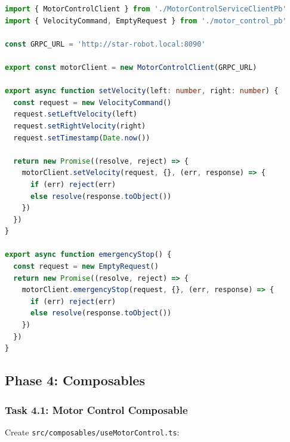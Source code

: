 \documentclass[11pt,letterpaper]{article}
\begin{document}
\begin{lstlisting}[language=TypeScript, caption=grpc/client.ts]
import { MotorControlClient } from './MotorControlServiceClientPb'
import { VelocityCommand, EmptyRequest } from './motor_control_pb'

const GRPC_URL = 'http://star-robot.local:8090'

export const motorClient = new MotorControlClient(GRPC_URL)

export async function setVelocity(left: number, right: number) {
  const request = new VelocityCommand()
  request.setLeftVelocity(left)
  request.setRightVelocity(right)
  request.setTimestamp(Date.now())

  return new Promise((resolve, reject) => {
    motorClient.setVelocity(request, {}, (err, response) => {
      if (err) reject(err)
      else resolve(response.toObject())
    })
  })
}

export async function emergencyStop() {
  const request = new EmptyRequest()
  return new Promise((resolve, reject) => {
    motorClient.emergencyStop(request, {}, (err, response) => {
      if (err) reject(err)
      else resolve(response.toObject())
    })
  })
}
\end{lstlisting}

\subsection{Phase 4: Composables}

\subsubsection{Task 4.1: Motor Control Composable}

Create \texttt{src/composables/useMotorControl.ts}:
\end{document}
